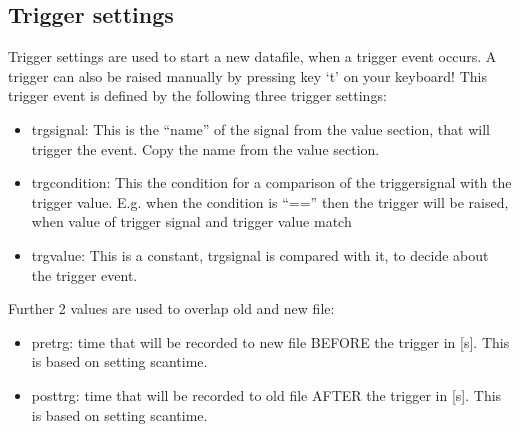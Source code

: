 \documentclass[a4paper,10pt,english]{sphinxmanual}
\begin{document}
\subsection{Trigger settings}
\label{configuration:trigger-settings}
Trigger settings are used to start a new datafile, when a trigger event occurs. A trigger can also be raised manually by pressing key `t' on your keyboard!
This trigger event is defined by the following three trigger settings:
\begin{itemize}
\item {} 
trgsignal: This is the ``name'' of the signal from the value section, that will trigger the event. Copy the name from the value section.

\item {} 
trgcondition: This the condition for a comparison of the triggersignal with the trigger value. E.g. when the condition is ``=='' then the trigger will be raised, when value of trigger signal and trigger value match

\item {} 
trgvalue: This is a constant, trgsignal is compared with it, to decide about the trigger event.

\end{itemize}

Further 2 values are used to overlap old and new file:
\begin{itemize}
\item {} 
pretrg: time that will be recorded to new file BEFORE the trigger in {[}s{]}. This is based on setting scantime.

\item {} 
posttrg: time that will be recorded to old file AFTER the trigger in {[}s{]}. This is based on setting scantime.

\end{itemize}
\end{document}
